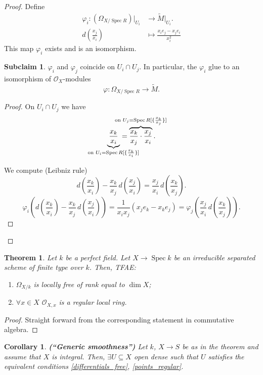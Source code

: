 \documentclass[12pt]{article}
\DeclareMathOperator{\Spec}{Spec}
\newtheorem*{theorem}{Theorem}
\newtheorem*{corollary}{Corollary}
\theoremstyle{definition}
\newtheorem{subclaim}{Subclaim}
\begin{document}
\begin{proof}
Define
\begin{align*}
\varphi_i:(\Omega_{X/\Spec R})|_{U_i}&\longrightarrow\widetilde M|_{U_i}.\\d\left(\frac{x_j}{x_i}\right)&\longmapsto\frac{x_ie_j-x_je_i}{x_i^2}
\end{align*}
This map $\varphi_i$ exists and is an isomorphism.

\begin{subclaim}
$\varphi_i$ and $\varphi_j$ coincide on $U_i\cap U_j$. In particular, the $\varphi_i$ glue to an isomorphism of $\mathcal O_X$-modules
\[\varphi:\Omega_{X/\Spec R}\longrightarrow\widetilde M.\]
\end{subclaim}

\begin{proof}
On $U_i\cap U_j$ we have
\[\underbrace{\frac{x_k}{x_i}}_{\mathclap{\text{on }U_i=\Spec R[\{\frac{x_k}{x_i}\}]}}=\overbrace{\frac{x_k}{x_j}\cdot\frac{x_j}{x_i}}^{\mathclap{\text{on }U_j=\Spec R[\{\frac{x_k}{x_j}\}]}}.\]

We compute (Leibniz rule)
\[d\left(\frac{x_k}{x_i}\right)-\frac{x_k}{x_j}\,d\left(\frac{x_j}{x_i}\right)=\frac{x_j}{x_i}\,d\left(\frac{x_k}{x_j}\right).\]
\[\varphi_i\left(d\left(\frac{x_k}{x_i}\right)-\frac{x_k}{x_j}\,d\left(\frac{x_j}{x_i}\right)\right)=\frac1{x_ix_j}(x_je_k-x_ke_j)=\varphi_j\left(\frac{x_j}{x_i}\,d\left(\frac{x_k}{x_j}\right)\right).\]
\end{proof}
\end{proof}

\begin{theorem}
Let $k$ be a perfect field. Let $X\rightarrow\Spec k$ be an irreducible separated scheme of finite type over $k$. Then, TFAE:
\begin{enumerate}[label=\arabic*)]
\item\label{differentials_free} $\Omega_{X/k}$ is locally free of rank equal to $\dim X$;
\item\label{points_regular} $\forall x\in X$ $\mathcal O_{X,x}$ is a regular local ring.
\end{enumerate}
\end{theorem}

\begin{proof}
Straight forward from the corresponding statement in commutative algebra.
\end{proof}

\begin{corollary}
\emph{\textbf{(``Generic smoothness'')}} Let $k$, $X\rightarrow S$ be as in the theorem and assume that $X$ is integral. Then, $\exists U\subseteq X$ open dense such that $U$ satisfies the equivalent conditions \ref{differentials_free}, \ref{points_regular}.
\end{corollary}
\end{document}
